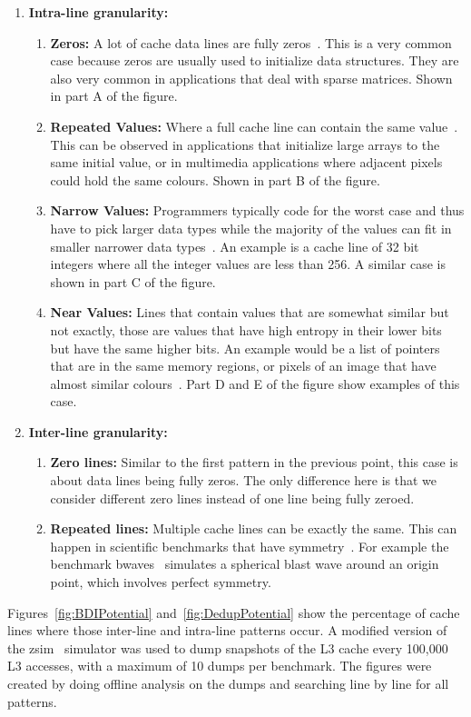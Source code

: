 \begin{enumerate}
    \item \textbf{Intra-line granularity:}
    \begin{enumerate}
        \item \textbf{Zeros:} A lot of cache data lines are fully zeros~\cite{balakrishnan2003exploiting, ekman2005robust, yang2000frequent}. This is a very common case because zeros are usually used to initialize data structures. They are also very common in applications that deal with sparse matrices. Shown in part A of the figure.
        \item \textbf{Repeated Values:} Where a full cache line can contain the same value~\cite{sazeides1997predictability, alameldeen2004adaptive}. This can be observed in applications that initialize large arrays to the same initial value, or in multimedia applications where adjacent pixels could hold the same colours. Shown in part B of the figure.
        \item \textbf{Narrow Values:} Programmers typically code for the worst case and thus have to pick larger data types while the majority of the values can fit in smaller narrower data types~\cite{alameldeen2004adaptive, islam2010characterization, wilson1999case}. An example is a cache line of 32 bit integers where all the integer values are less than 256. A similar case is shown in part C of the figure.
        \item \textbf{Near Values:} Lines that contain values that are somewhat similar but not exactly, those are values that have high entropy in their lower bits but have the same higher bits. An example would be a list of pointers that are in the same memory regions, or pixels of an image that have almost similar colours~\cite{wilson1999case, sun2008dhtc}. Part D and E of the figure show examples of this case.
    \end{enumerate}
    \item \textbf{Inter-line granularity:}
    \begin{enumerate}
        \item \textbf{Zero lines:} Similar to the first pattern in the previous point, this case is about data lines being fully zeros. The only difference here is that we consider different zero lines instead of one line being fully zeroed.
        \item \textbf{Repeated lines:} Multiple cache lines can be exactly the same. This can happen in scientific benchmarks that have symmetry~\cite{dedup}. For example the benchmark bwaves~\cite{spec} simulates a spherical blast wave around an origin point, which involves perfect symmetry.
    \end{enumerate}
\end{enumerate}
Figures~\ref{fig:BDIPotential} and~\ref{fig:DedupPotential} show the percentage of cache lines where those inter-line and intra-line patterns occur. A modified version of the zsim~\cite{zsim} simulator was used to dump snapshots of the L3 cache every 100,000 L3 accesses, with a maximum of 10 dumps per benchmark. The figures were created by doing offline analysis on the dumps and searching line by line for all patterns.

